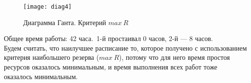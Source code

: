 \begin{figure}[H]
\begin{center}
	\texttt{[image: diag4]}
	\caption{Диаграмма Ганта. Критерий $max\ R$}
	\label{pic:diag4}
\end{center}
\end{figure}

Общее время работы: 42 часа.\  1-й простаивал 0 часов, 2-й --- 8 часов.\\[1cm]

Будем считать, что наилучшее расписание то, которое получено с использованием критерия наибольшего резерва ($max\ R$), потому что для него время простоя ресурсов оказалось минимальным, и время выполнения всех работ тоже оказалось минимальным. 

